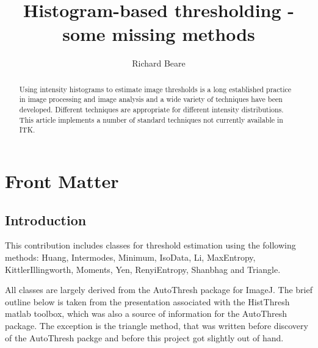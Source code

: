 \documentclass{InsightArticle}
\title{Histogram-based thresholding - some missing methods}
\author{Richard Beare}
\newcommand{\IJhandlerIDnumber}{}
\begin{document}
%
% 
\IJhandlefooter{\IJhandlerIDnumber}

\maketitle

\ifhtml
\chapter*{Front Matter\label{front}}
\fi


\begin{abstract}
\noindent
Using intensity histograms to estimate image thresholds is a long
established practice in image processing and image analysis and a wide
variety of techniques have been developed. Different techniques are
appropriate for different intensity distributions. This article
implements a number of standard techniques not currently available in
ITK.
\end{abstract}

\IJhandlenote{\IJhandlerIDnumber}

\tableofcontents

\section{Introduction}
This contribution includes classes for threshold estimation using the
following methods: Huang\cite{huang1995image},
Intermodes\cite{prewitt1965analysis},
Minimum\cite{prewitt1965analysis}, IsoData\cite{ridler1978picture},
Li\cite{li1993minimum,li1998iterative}, MaxEntropy\cite{kapur1985new},
KittlerIllingworth\cite{kittler1986minimum},
Moments\cite{tsai1985moment}, Yen\cite{yen1995new},
RenyiEntropy\cite{kapur1985new},
Shanbhag\cite{shanbhag1994utilization} and
Triangle\cite{zack1977automatic}.

All classes are largely derived from the AutoThresh
\cite{LandiniImageJ} package for ImageJ. The brief outline below is
taken from the presentation associated with the
HistThresh\cite{HistThreshMatlab} matlab toolbox, which was also a
source of information for the AutoThresh package. The exception is the
triangle method, that was written before discovery of the AutoThresh
packge and before this project got slightly out of hand.
\end{document}
